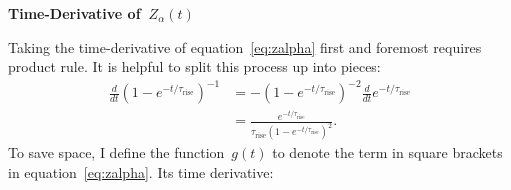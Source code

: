 \documentclass[12pt]{article}
\newcommand{\timescale}[1]{\ensuremath{\tau_\text{#1}}}
\begin{document}
\newpage
\noindent
\textbf{Time-Derivative of~$Z_\alpha(t)$}
\par\noindent
Taking the time-derivative of equation~\ref{eq:zalpha} first and foremost
requires product rule.
It is helpful to split this process up into pieces:
\begin{subequations}\begin{align}
\frac{d}{dt} (1 - e^{-t / \timescale{rise}})^{-1} &=
-(1 - e^{-t / \timescale{rise}})^{-2}\frac{d}{dt}e^{-t / \timescale{rise}}
\\
&= \frac{
	e^{-t / \timescale{rise}}
}{
	\timescale{rise} (1 - e^{-t / \timescale{rise}})^2
}.
\end{align}\end{subequations}
To save space, I define the function~$g(t)$ to denote the term in square
brackets in equation~\ref{eq:zalpha}.
Its time derivative:
\end{document}
